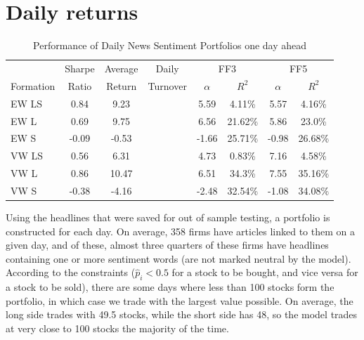 \section{Daily returns}
\label{sec:daily-returns-analysis}

\begin{table}[!ht]
\begin{center}
\begin{tabular}{lccccccc}
      \toprule
      & Sharpe &  Average & Daily & \multicolumn{2}{c}{FF3} & \multicolumn{2}{c}{FF5} \\
      \cmidrule(lr){5-6}
      \cmidrule(lr){7-8}
      Formation & Ratio & Return & Turnover & $\alpha$ & $R^2$ & $\alpha$ & $R^2$ \\
      \midrule
      EW LS & 0.84 & 9.23 & & 5.59 & 4.11\% & 5.57 & 4.16\% \\
      EW L & 0.69 & 9.75 & & 6.56 & 21.62\% & 5.86 & 23.0\% \\
      EW S & -0.09 & -0.53 & & -1.66 & 25.71\% & -0.98 & 26.68\% \\
      VW LS & 0.56 & 6.31 & & 4.73 & 0.83\% & 7.16 & 4.58\% \\
      VW L & 0.86 & 10.47 & & 6.51 & 34.3\% & 7.55 & 35.16\% \\
      VW S & -0.38 & -4.16 & & -2.48 & 32.54\% & -1.08 & 34.08\% \\
      \bottomrule
\end{tabular}
\caption{Performance of Daily News Sentiment Portfolios one day ahead}
\label{portfolio-performance}
\end{center}
\end{table}

Using the headlines that were saved for out of sample testing, a portfolio is constructed for each day. On average, 358 firms have articles linked to them on a given day, and of these, almost three quarters of these firms have headlines containing one or more sentiment words (are not marked neutral by the model). According to the constraints ($\widehat p_i < 0.5$ for a stock to be bought, and vice versa for a stock to be sold), there are some days where less than 100 stocks form the portfolio, in which case we trade with the largest value possible. On average, the long side trades with 49.5 stocks, while the short side has 48, so the model trades at very close to 100 stocks the majority of the time.

